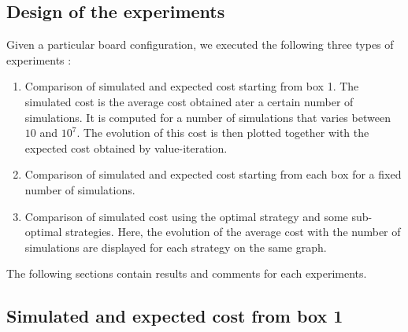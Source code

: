 \subsection{Design of the experiments}
Given a particular board configuration, we executed the following three types of experiments : 
\begin{enumerate}
	\item Comparison of simulated and expected cost starting from box 1.
	The simulated cost is the average cost obtained ater a certain number of simulations.
	It is computed for a number of simulations that varies between $10$ and $10^7$. 
	The evolution of this cost is then plotted together with the expected cost obtained by value-iteration.
	\item Comparison of simulated and expected cost starting from each box for a fixed number of simulations.
	\item Comparison of simulated cost using the optimal strategy and some sub-optimal strategies. 
	Here, the evolution of the average cost  with the number of simulations are displayed for each strategy on the same graph.
\end{enumerate}
The following sections contain results and comments for each experiments.

\subsection{Simulated and expected cost from box 1}

